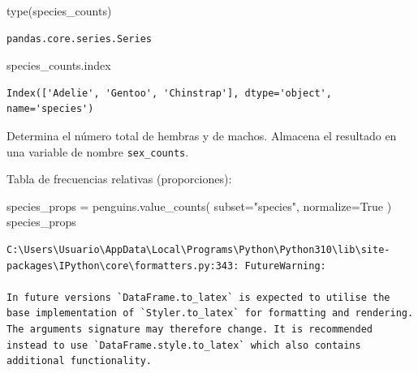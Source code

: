\documentclass[
  a4paper,
  noprof,
  12pt,
  notoc,
  nosols,
  nobib]{mnye}
\newenvironment{Shaded}{\begin{snugshade}}{\end{snugshade}}
\newcommand{\BuiltInTok}[1]{\textcolor[rgb]{0.00,0.23,0.31}{#1}}
\newcommand{\NormalTok}[1]{\textcolor[rgb]{0.00,0.23,0.31}{#1}}
\newcommand{\OperatorTok}[1]{\textcolor[rgb]{0.37,0.37,0.37}{#1}}
\newcommand{\StringTok}[1]{\textcolor[rgb]{0.13,0.47,0.30}{#1}}
\newcommand{\VariableTok}[1]{\textcolor[rgb]{0.07,0.07,0.07}{#1}}
\renewenvironment{exercise}[1][]{
            \if\relax\detokenize{#1}\relax
                \ex
            \else
                \ex[note={#1}]
            \fi
        }{\endex}
\theoremstyle{definition}
\newtheorem{exercise}{Ejercicio}[section]
\theoremstyle{remark}
\begin{document}
\begin{Shaded}
\begin{Highlighting}[]
\BuiltInTok{type}\NormalTok{(species\_counts)}
\end{Highlighting}
\end{Shaded}

\begin{verbatim}
pandas.core.series.Series
\end{verbatim}

\begin{Shaded}
\begin{Highlighting}[]
\NormalTok{species\_counts.index}
\end{Highlighting}
\end{Shaded}

\begin{verbatim}
Index(['Adelie', 'Gentoo', 'Chinstrap'], dtype='object', name='species')
\end{verbatim}

\begin{exercise}[]%
\protect\hypertarget{exr-1categorial-sex-counts}{}\label{exr-1categorial-sex-counts}%
Determina el número total de hembras y de machos. Almacena el resultado
en una variable de nombre \texttt{sex\_counts}.

\end{exercise}

Tabla de frecuencias relativas (proporciones):

\begin{Shaded}
\begin{Highlighting}[]
\NormalTok{species\_props }\OperatorTok{=}\NormalTok{ penguins.value\_counts(}
\NormalTok{    subset}\OperatorTok{=}\StringTok{"species"}\NormalTok{,}
\NormalTok{    normalize}\OperatorTok{=}\VariableTok{True}
\NormalTok{)}
\NormalTok{species\_props}
\end{Highlighting}
\end{Shaded}

\begin{verbatim}
C:\Users\Usuario\AppData\Local\Programs\Python\Python310\lib\site-packages\IPython\core\formatters.py:343: FutureWarning:

In future versions `DataFrame.to_latex` is expected to utilise the base implementation of `Styler.to_latex` for formatting and rendering. The arguments signature may therefore change. It is recommended instead to use `DataFrame.style.to_latex` which also contains additional functionality.
\end{verbatim}
\end{document}

